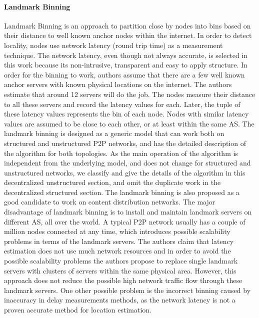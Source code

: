 \documentclass[acmcsur]{acmtrans2m}
\begin{document}
\paragraph*{\bf Landmark Binning}\label{sec:landmark_binning}

Landmark Binning \cite{ratnasamy_binning_2002} is an approach to partition close
by nodes into bins based on their distance to well known anchor nodes within the
internet. In order to detect locality, nodes use network latency (round trip
time) as a measurement technique. The network latency, even though not always
accurate, is selected in this work because its non-intrusive, transparent and
easy to apply structure. In order for the binning to work, authors assume that
there are a few well known anchor servers with known physical locations on the
internet. The authors estimate that around 12 servers will do the job. The nodes
measure their distance to all these servers and record the latency values for
each. Later, the tuple of these latency values represents the bin of each node.
Nodes with similar latency values are assumed to be close to each other, or at
least within the same AS. The landmark binning is designed as a generic model
that can work both on structured and unstructured P2P networks, and
\cite{ratnasamy_binning_2002} has the detailed description of the algorithm for
both topologies. As the main operation of the algorithm is independent from the
underlying model, and does not change for structured and unstructured networks,
we classify and give the details of the algorithm in this decentralized
unstructured section, and omit the duplicate work in the decentralized
structured section. The landmark binning is also proposed as a good candidate to
work on content distribution networks. The major disadvantage of landmark
binning is to install and maintain landmark servers on different AS, all over
the world.  A typical P2P network usually has a couple of million nodes
connected at any time, which introduces possible scalability problems in terms
of the landmark servers.  The authors claim that latency estimation does not use
much network resources and in order to avoid the possible scalability problems
the authors propose to replace single landmark servers with clusters of servers
within the same physical area. However, this approach does not reduce the
possible high network traffic flow through these landmark servers. One other
possible problem is the incorrect binning caused by inaccuracy in delay
measurements methods, as the network latency is not a proven accurate method for
location estimation.
\end{document}
